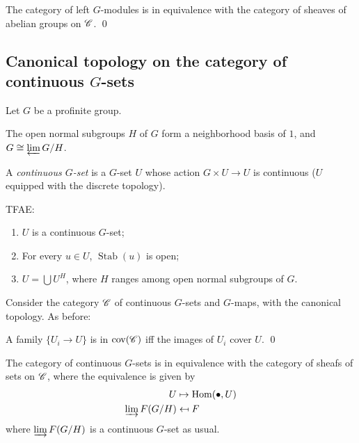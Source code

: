 \documentclass[11pt]{amsart}
\begin{document}
\begin{cor}
    The category of left $G$-modules is in equivalence with the category of sheaves of abelian groups on $\mathscr{C}$. \qed
\end{cor}



\subsection{Canonical topology on the category of continuous $G$-sets}

Let $G$ be a profinite group.

\begin{prop}
    The open normal subgroups $H$ of $G$ form a neighborhood basis of $1$, and $G\cong \varprojlim G/H$.
\end{prop}

A \emph{continuous $G$-set} is a $G$-set $U$ whose action $G\times U\to U$ is continuous ($U$ equipped with the discrete topology).

\begin{prop}
    TFAE:
    \begin{enumerate}
        \item $U$ is a continuous $G$-set;
        \item For every $u\in U$, $\operatorname{Stab}(u)$ is open;
        \item $U = \bigcup U^H$, where $H$ ranges among open normal subgroups of $G$.
    \end{enumerate}
\end{prop}

Consider the category $\mathscr{C}$ of continuous $G$-sets and $G$-maps, with the canonical topology. As before:

\begin{prop}
    A family $\{U_i\to U\}$ is in $\operatorname{cov}(\mathscr{C})$ iff the images of $U_i$ cover $U$. \qed
\end{prop}

\begin{prop}
    The category of continuous $G$-sets is in equivalence with the category of sheafs of sets on $\mathscr{C}$, where the equivalence is given by
    \begin{align*}
        U &\mapsto \operatorname{Hom}(\bullet, U) \\
        \varinjlim F(G/H) &\mapsfrom F
    \end{align*}
    where $\varinjlim F(G/H)$ is a continuous $G$-set as usual.
\end{prop}
\end{document}
